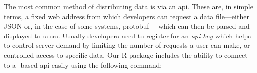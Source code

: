 The most common method of distributing \rt{} data is via an \gls{api}. These are, in simple terms, a fixed web address from which developers can request a data file---either JSON or, in the case of some \GTFS{} systems, protobuf \citep{cn}---which can then be parsed and displayed to users. Usually developers need to register for an \emph{\gls{api} key} which helps to control server demand by limiting the number of requests a user can make, or controlled access to specific data. Our R package includes the ability to connect to a \GTFS{}-based \gls{api} easily using the following command:
\begin{knitrout}\small
{}\color{fgcolor}
\end{knitrout}
